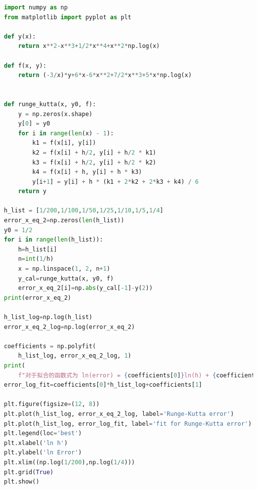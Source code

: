 \documentclass[a4paper,11pt,notitlepage]{article}
\begin{document}
\begin{lstlisting}[language=Python,caption={Final exam2.py},label={code1.2}]
import numpy as np
from matplotlib import pyplot as plt

def y(x):
    return x**2-x**3+1/2*x**4+x**2*np.log(x)

def f(x, y):
    return (-3/x)*y+6*x-6*x**2+7/2*x**3+5*x*np.log(x)


def runge_kutta(x, y0, f):
    y = np.zeros(x.shape)
    y[0] = y0
    for i in range(len(x) - 1):
        k1 = f(x[i], y[i])
        k2 = f(x[i] + h/2, y[i] + h/2 * k1)
        k3 = f(x[i] + h/2, y[i] + h/2 * k2)
        k4 = f(x[i] + h, y[i] + h * k3)
        y[i+1] = y[i] + h * (k1 + 2*k2 + 2*k3 + k4) / 6
    return y

h_list = [1/200,1/100,1/50,1/25,1/10,1/5,1/4]
error_x_eq_2=np.zeros(len(h_list))
y0 = 1/2
for i in range(len(h_list)):
    h=h_list[i]
    n=int(1/h)
    x = np.linspace(1, 2, n+1)
    y_cal=runge_kutta(x, y0, f)
    error_x_eq_2[i]=np.abs(y_cal[-1]-y(2))
print(error_x_eq_2)

h_list_log=np.log(h_list)
error_x_eq_2_log=np.log(error_x_eq_2)

coefficients = np.polyfit(
    h_list_log, error_x_eq_2_log, 1)
print(
    f"对于拟合的函数式为 ln(error) = {coefficients[0]}ln(h) + {coefficients[1]}")
error_log_fit=coefficients[0]*h_list_log+coefficients[1]

plt.figure(figsize=(12, 8))
plt.plot(h_list_log, error_x_eq_2_log, label='Runge-Kutta error')
plt.plot(h_list_log, error_log_fit, label='fit for Runge-Kutta error')
plt.legend(loc='best')
plt.xlabel('ln h')
plt.ylabel('ln Error')
plt.xlim((np.log(1/200),np.log(1/4)))
plt.grid(True)
plt.show()       
\end{lstlisting}
\end{document}

